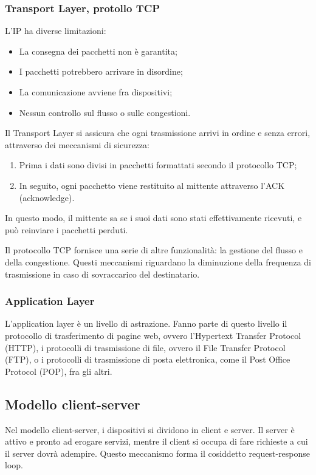 \documentclass[a4paper,11pt]{article}
\begin{document}
\subsubsection{Transport Layer, protollo TCP}
L'IP ha diverse limitazioni:
\begin{itemize}
	\item La consegna dei pacchetti non è garantita;
	\item I pacchetti potrebbero arrivare in disordine;
	\item La comunicazione avviene fra dispositivi;
	\item Nessun controllo sul flusso o sulle congestioni.
\end{itemize}

Il Transport Layer si assicura che ogni trasmissione arrivi in ordine e senza errori, attraverso dei meccanismi di sicurezza:
\begin{enumerate}
	\item Prima i dati sono divisi in pacchetti formattati secondo il protocollo TCP;
	\item In seguito, ogni pacchetto viene restituito al mittente attraverso l'ACK (acknowledge).
\end{enumerate}
In questo modo, il mittente sa se i suoi dati sono stati effettivamente ricevuti, e può reinviare i pacchetti perduti.

Il protocollo TCP fornisce una serie di altre funzionalità: la gestione del flusso e della congestione.
Questi meccanismi riguardano la diminuzione della frequenza di trasmissione in caso di sovraccarico del destinatario.

\subsubsection{Application Layer}
L'application layer è un livello di astrazione.
Fanno parte di questo livello il protocollo di trasferimento di pagine web, ovvero l'Hypertext Transfer Protocol (HTTP), i protocolli di trasmissione di file, ovvero il File Transfer Protocol (FTP), o i protocolli di trasmissione di posta elettronica, come il Post Office Protocol (POP), fra gli altri. 

\subsection{Modello client-server}
Nel modello client-server, i dispositivi si dividono in client e server.
Il server è attivo e pronto ad erogare servizi, mentre il client si occupa di fare richieste a cui il server dovrà adempire.
Questo meccanismo forma il cosiddetto request-response loop.
\end{document}
